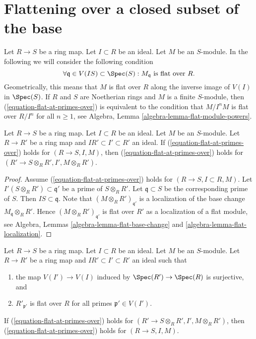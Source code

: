 \section{Flattening over a closed subset of the base}
\label{section-flattening-local-base}

\noindent
Let $R \to S$ be a ring map.
Let $I \subset R$ be an ideal.
Let $M$ be an $S$-module.
In the following we will consider the following condition
\begin{equation}
\label{equation-flat-at-primes-over}
\forall \mathfrak q \in V(IS) \subset \Spec(S) :
M_{\mathfrak q}\text{ is flat over }R.
\end{equation}
Geometrically, this means that $M$ is flat over $R$ along the inverse
image of $V(I)$ in $\Spec(S)$. If $R$ and $S$ are Noetherian rings and
$M$ is a finite $S$-module, then (\ref{equation-flat-at-primes-over})
is equivalent to the condition that $M/I^nM$ is flat over $R/I^n$
for all $n \geq 1$, see
Algebra, Lemma \ref{algebra-lemma-flat-module-powers}.

\begin{lemma}
\label{lemma-base-change-flat-at-primes-over}
Let $R \to S$ be a ring map.
Let $I \subset R$ be an ideal.
Let $M$ be an $S$-module.
Let $R \to R'$ be a ring map and $IR' \subset I' \subset R'$ an ideal.
If (\ref{equation-flat-at-primes-over}) holds for
$(R \to S, I, M)$, then (\ref{equation-flat-at-primes-over})
holds for $(R' \to S \otimes_R R', I', M \otimes_R R')$.
\end{lemma}

\begin{proof}
Assume (\ref{equation-flat-at-primes-over}) holds for
$(R \to S, I \subset R, M)$.
Let $I'(S \otimes_R R') \subset \mathfrak q'$ be a prime of $S \otimes_R R'$.
Let $\mathfrak q \subset S$ be the corresponding prime of $S$.
Then $IS \subset \mathfrak q$. Note that $(M \otimes_R R')_{\mathfrak q'}$
is a localization of the base change $M_{\mathfrak q} \otimes_R R'$.
Hence $(M \otimes_R R')_{\mathfrak q'}$ is flat over $R'$ as a localization
of a flat module, see
Algebra, Lemmas \ref{algebra-lemma-flat-base-change} and
\ref{algebra-lemma-flat-localization}.
\end{proof}

\begin{lemma}
\label{lemma-flat-descent-flat-at-primes-over}
Let $R \to S$ be a ring map.
Let $I \subset R$ be an ideal.
Let $M$ be an $S$-module.
Let $R \to R'$ be a ring map and $IR' \subset I' \subset R'$ an ideal
such that
\begin{enumerate}
\item the map $V(I') \to V(I)$ induced by
$\Spec(R') \to \Spec(R)$ is surjective, and
\item $R'_{\mathfrak p'}$ is flat over $R$ for all primes
$\mathfrak p' \in V(I')$.
\end{enumerate}
If (\ref{equation-flat-at-primes-over}) holds for
$(R' \to S \otimes_R R', I', M \otimes_R R')$, then
(\ref{equation-flat-at-primes-over}) holds for $(R \to S, I, M)$.
\end{lemma}

